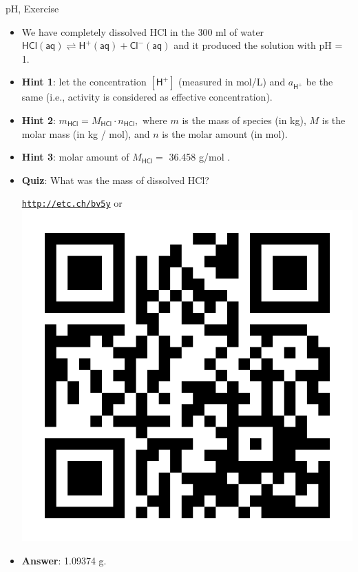 \begin{frame}{pH, Exercise}
	\small
	\begin{itemize}
		\item We have completely dissolved HCl in the 300 ml of water  
		$\mathsf{HCl(aq) \rightleftharpoons H^+(aq) + Cl^-(aq)}$
		 and it produced the solution with pH = 1. 
		\pause
		\item {\bf Hint 1}: let the concentration $[\mathsf{H^+}]$ (measured in mol/L) and $a_{\mathsf{H^+}}$ be the same (i.e., activity is considered as effective concentration). 
		\item {\bf Hint 2}: $m_{\mathsf{HCl}} = M_{\mathsf{HCl}}  \cdot n_{\mathsf{HCl}},$ 
		where $m$ is the mass of species (in kg), 
		$M$ is the molar mass (in kg / mol), and 
		$n$ is the molar amount (in mol). 
		\item {\bf Hint 3}: molar amount of $M_{\mathsf{HCl}} = $ 36.458 g/mol .
		\pause
		\item  \alert{\bf Quiz}: What was the mass of dissolved HCl?
		\begin{center}
			\href{http://etc.ch/bv5y}{\textcolor{indigo(dye)}{\tt http://etc.ch/bv5y}} 
			\quad
			or 
			\quad
			\includegraphics[height=0.2\columnwidth]{figures/chemical-equilibrium/poll.png}
		\end{center}
		\hiddenpause
		\item {\bf Answer}: 1.09374 g. 
	\end{itemize}
	
\end{frame}
%
